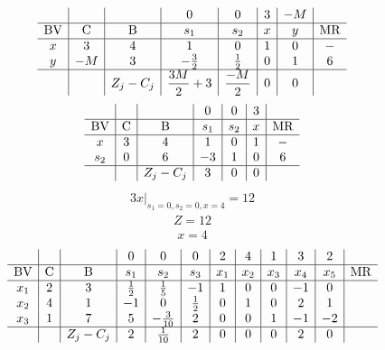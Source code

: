 \documentclass{article}
\begin{document}
\begin{align*}
\begin{array}{c|c|c|c|c|c|c|c}
 &  &  & 0 & 0 & 3 & -M & \\
\hline
\text{BV} & \text{C} & \text{B} & s_{1} & s_{2} & x & y & \text{MR} \\
\hline
x & 3 & 4 & 1 & 0 & 1 & 0 & - \\
y & -M & 3 & -\frac{3}{2} & \frac{1}{2} & 0 & 1 & 6 \\
\hline
 &  & Z_j-C_j & \dfrac{3M}{2} + 3 & \dfrac{-M}{2} & 0 & 0 & \\
\end{array}
\end{align*}
\begin{align*}
\begin{array}{c|c|c|c|c|c|c}
 &  &  & 0 & 0 & 3 & \\
\hline
\text{BV} & \text{C} & \text{B} & s_{1} & s_{2} & x & \text{MR} \\
\hline
x & 3 & 4 & 1 & 0 & 1 & - \\
s_{2} & 0 & 6 & -3 & 1 & 0 & 6 \\
\hline
 &  & Z_j-C_j & 3 & 0 & 0 & \\
\end{array}
\end{align*}
\begin{align*}
\left.3x\right|_{s_{1}=0,s_{2}=0,x=4}=12\end{align*}
\begin{align*}
Z=12\end{align*}
\begin{align*}
x=4\end{align*}
\begin{align*}
\begin{array}{c|c|c|c|c|c|c|c|c|c|c|c}
 &  &  & 0 & 0 & 0 & 2 & 4 & 1 & 3 & 2 & \\
\hline
\text{BV} & \text{C} & \text{B} & s_{1} & s_{2} & s_{3} & x_{1} & x_{2} & x_{3} & x_{4} & x_{5} & \text{MR} \\
\hline
x_{1} & 2 & 3 & \frac{1}{2} & \frac{1}{5} & -1 & 1 & 0 & 0 & -1 & 0 \\
x_{2} & 4 & 1 & -1 & 0 & \frac{1}{2} & 0 & 1 & 0 & 2 & 1 \\
x_{3} & 1 & 7 & 5 & -\frac{3}{10} & 2 & 0 & 0 & 1 & -1 & -2 \\
\hline
 &  & Z_j-C_j & 2 & \frac{1}{10} & 2 & 0 & 0 & 0 & 2 & 0 & \\
\end{array}
\end{align*}
\end{document}
